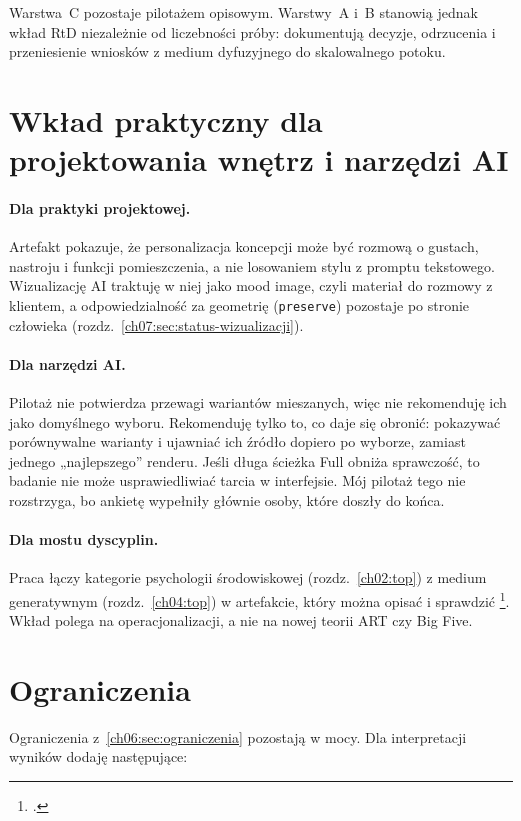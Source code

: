 Warstwa~C pozostaje pilotażem opisowym. Warstwy~A i~B stanowią jednak wkład RtD niezależnie od liczebności próby: dokumentują decyzje, odrzucenia i przeniesienie wniosków z medium dyfuzyjnego do skalowalnego potoku.

\section{Wkład praktyczny dla projektowania wnętrz i narzędzi AI}
\label{ch09:sec:praktyka}

\paragraph{Dla praktyki projektowej.}
Artefakt pokazuje, że personalizacja koncepcji może być rozmową o gustach, nastroju i funkcji pomieszczenia, a nie losowaniem stylu z promptu tekstowego. Wizualizację AI traktuję w niej jako mood image, czyli materiał do rozmowy z klientem, a odpowiedzialność za geometrię (\texttt{preserve}) pozostaje po stronie człowieka (rozdz.~\ref{ch07:sec:status-wizualizacji}).

\paragraph{Dla narzędzi AI.}
Pilotaż nie potwierdza przewagi wariantów mieszanych, więc nie rekomenduję ich jako domyślnego wyboru. Rekomenduję tylko to, co daje się obronić: pokazywać porównywalne warianty i ujawniać ich źródło dopiero po wyborze, zamiast jednego „najlepszego” renderu. Jeśli długa ścieżka Full obniża sprawczość, to badanie nie może usprawiedliwiać tarcia w interfejsie. Mój pilotaż tego nie rozstrzyga, bo ankietę wypełniły głównie osoby, które doszły do końca.

\paragraph{Dla mostu dyscyplin.}
Praca łączy kategorie psychologii środowiskowej (rozdz.~\ref{ch02:top}) z medium generatywnym (rozdz.~\ref{ch04:top}) w artefakcie, który można opisać i sprawdzić \footcite{idaPlatform2026}. Wkład polega na operacjonalizacji, a nie na nowej teorii ART czy Big Five.

\section{Ograniczenia}
\label{ch09:sec:ograniczenia}

Ograniczenia z~\cref{ch06:sec:ograniczenia} pozostają w mocy. Dla interpretacji wyników dodaję następujące:

